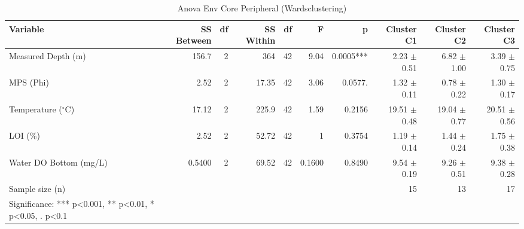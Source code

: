 \begin{table}[htbp]
  \centering
  \caption{Anova Env Core Peripheral (Wardsclustering)}
  \label{tab:WardsClustering_tables_anova_env_core_peripheral}
  \small
  \begin{tabular}{lrrrrrrrrr}
    \toprule
    Variable & SS Between & df & SS Within & df  & F & p & Cluster C1 & Cluster C2 & Cluster C3 \\
    \midrule
    Measured Depth (m) & 156.7 & 2 & 364 & 42 & 9.04 & 0.0005*** & 2.23 $\pm$ 0.51 & 6.82 $\pm$ 1.00 & 3.39 $\pm$ 0.75 \\
    MPS (Phi) & 2.52 & 2 & 17.35 & 42 & 3.06 & 0.0577. & 1.32 $\pm$ 0.11 & 0.78 $\pm$ 0.22 & 1.30 $\pm$ 0.17 \\
    Temperature ($^{\circ}$C) & 17.12 & 2 & 225.9 & 42 & 1.59 & 0.2156 & 19.51 $\pm$ 0.48 & 19.04 $\pm$ 0.77 & 20.51 $\pm$ 0.56 \\
    LOI (\%) & 2.52 & 2 & 52.72 & 42 & 1 & 0.3754 & 1.19 $\pm$ 0.14 & 1.44 $\pm$ 0.24 & 1.75 $\pm$ 0.38 \\
    Water DO Bottom (mg/L) & 0.5400 & 2 & 69.52 & 42 & 0.1600 & 0.8490 & 9.54 $\pm$ 0.19 & 9.26 $\pm$ 0.51 & 9.38 $\pm$ 0.28 \\
    Sample size (n) &  &  &  &  &  &  & 15 & 13 & 17 \\
    Significance: *** p<0.001, ** p<0.01, * p<0.05, . p<0.1 &  &  &  &  &  &  &  &  &  \\
    \bottomrule
  \end{tabular}
\end{table}

